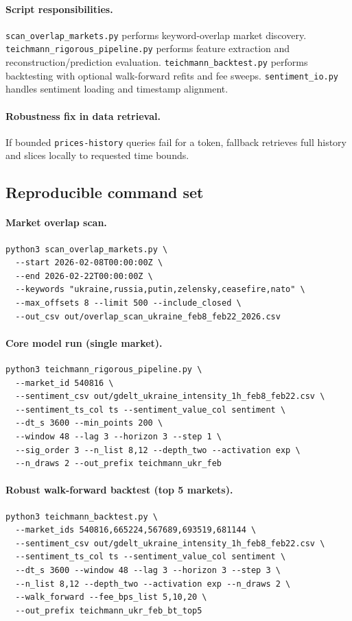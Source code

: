 \documentclass[11pt]{article}
\begin{document}
\paragraph{Script responsibilities.}
\texttt{scan\_overlap\_markets.py} performs keyword-overlap market discovery. \texttt{teichmann\_rigorous\_pipeline.py} performs feature extraction and reconstruction/prediction evaluation. \texttt{teichmann\_backtest.py} performs backtesting with optional walk-forward refits and fee sweeps. \texttt{sentiment\_io.py} handles sentiment loading and timestamp alignment.

\paragraph{Robustness fix in data retrieval.}
If bounded \texttt{prices-history} queries fail for a token, fallback retrieves full history and slices locally to requested time bounds.

\subsection{Reproducible command set}
\paragraph{Market overlap scan.}
\begin{verbatim}
python3 scan_overlap_markets.py \
  --start 2026-02-08T00:00:00Z \
  --end 2026-02-22T00:00:00Z \
  --keywords "ukraine,russia,putin,zelensky,ceasefire,nato" \
  --max_offsets 8 --limit 500 --include_closed \
  --out_csv out/overlap_scan_ukraine_feb8_feb22_2026.csv
\end{verbatim}

\paragraph{Core model run (single market).}
\begin{verbatim}
python3 teichmann_rigorous_pipeline.py \
  --market_id 540816 \
  --sentiment_csv out/gdelt_ukraine_intensity_1h_feb8_feb22.csv \
  --sentiment_ts_col ts --sentiment_value_col sentiment \
  --dt_s 3600 --min_points 200 \
  --window 48 --lag 3 --horizon 3 --step 1 \
  --sig_order 3 --n_list 8,12 --depth_two --activation exp \
  --n_draws 2 --out_prefix teichmann_ukr_feb
\end{verbatim}

\paragraph{Robust walk-forward backtest (top 5 markets).}
\begin{verbatim}
python3 teichmann_backtest.py \
  --market_ids 540816,665224,567689,693519,681144 \
  --sentiment_csv out/gdelt_ukraine_intensity_1h_feb8_feb22.csv \
  --sentiment_ts_col ts --sentiment_value_col sentiment \
  --dt_s 3600 --window 48 --lag 3 --horizon 3 --step 3 \
  --n_list 8,12 --depth_two --activation exp --n_draws 2 \
  --walk_forward --fee_bps_list 5,10,20 \
  --out_prefix teichmann_ukr_feb_bt_top5
\end{verbatim}
\end{document}
